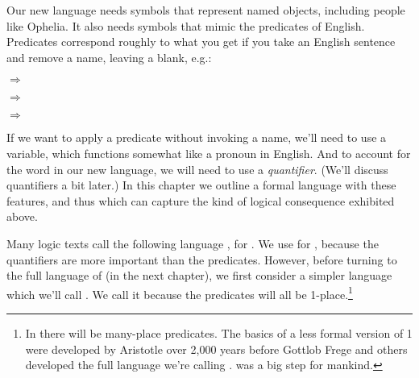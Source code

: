 Our new language needs symbols that represent named objects, including people like Ophelia.  It also needs symbols that mimic the predicates of English.  Predicates correspond roughly to what you get if you take an English sentence and remove a name, leaving a blank, e.g.: 

\begin{menumerate}
	\item {} $\Rightarrow$ 
	\item {} $\Rightarrow$ 
	\item {} $\Rightarrow$ 	
\end{menumerate}

\noindent{}If we want to apply a predicate without invoking a name, we'll need to use a variable, which functions somewhat like a pronoun in English.  And to account for the word  in our new language, we will need to use a \emph{quantifier}.  (We'll discuss quantifiers a bit later.)  In this chapter we outline a formal language with these features, and thus which can capture the kind of logical consequence exhibited above.

Many logic texts call the following language \PL{}, for . 
We use \mention{\QL{}} for , because the quantifiers are more important than the predicates. However, before turning to the full language of \GQL{} (in the next chapter), we first consider a simpler language which we'll call .  We call it  because the predicates will all be 1-place.\footnote{In \GQL{} there will be many-place predicates.  The basics of a less formal version of \GQL{}1 were developed by Aristotle over 2,000 years before Gottlob Frege and others developed the full language we're calling \GQL{}.  \GQL{} was a big step for mankind.}
 
